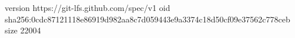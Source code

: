 version https://git-lfs.github.com/spec/v1
oid sha256:0cdc87121118e86919d982aa8c7d059443e9a3374c18d50cf09e37562c778ceb
size 22004
